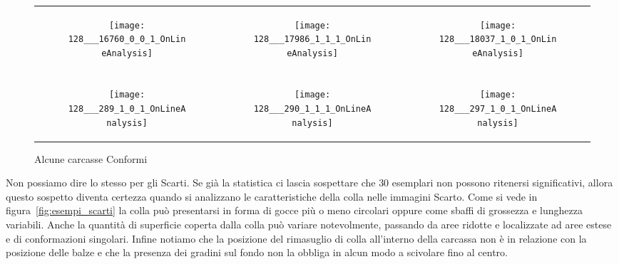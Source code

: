 \begin{figure}[ht] %
  \begin{center}
    \begin{tabular}{ccc}

  \begin{subfigure}{.3\linewidth}
    \centering\texttt{[image: 128\_\_\_16760\_0\_0\_1\_OnLineAnalysis]}
    \caption{}
  \end{subfigure} &

  \begin{subfigure}{.3\linewidth}
      \texttt{[image: 128\_\_\_17986\_1\_1\_1\_OnLineAnalysis]}
      \caption{}
    \end{subfigure} &

  \begin{subfigure}{.3\linewidth}
      \texttt{[image: 128\_\_\_18037\_1\_0\_1\_OnLineAnalysis]}
      \caption{}
    \end{subfigure} \\ \\

  \begin{subfigure}{.3\linewidth}
      \texttt{[image: 128\_\_\_289\_1\_0\_1\_OnLineAnalysis]}
      \caption{}
    \end{subfigure} &

  \begin{subfigure}{.3\linewidth}
      \texttt{[image: 128\_\_\_290\_1\_1\_1\_OnLineAnalysis]}
      \caption{}
    \end{subfigure} &

    \begin{subfigure}{.3\linewidth}
      \texttt{[image: 128\_\_\_297\_1\_0\_1\_OnLineAnalysis]}
      \caption{}
    \end{subfigure} \\

    \end{tabular}
    \caption{Alcune carcasse Conformi}
    \label{fig:esempi_conformi}
  \end{center}
\end{figure}


Non possiamo dire lo stesso per gli Scarti.
Se già la statistica ci lascia sospettare che $30$ esemplari non possono ritenersi significativi, allora questo sospetto diventa certezza quando si analizzano le caratteristiche della colla nelle immagini Scarto.  
Come si vede in figura~\ref{fig:esempi_scarti} la colla può presentarsi in forma di gocce più o meno circolari oppure come sbaffi di grossezza e lunghezza variabili.
Anche la quantità di superficie coperta dalla colla può variare notevolmente, passando da aree ridotte e localizzate ad aree estese e di conformazioni singolari.
Infine notiamo che la posizione del rimasuglio di colla all'interno della carcassa non è in relazione con la posizione delle balze e che la presenza dei gradini sul fondo non la obbliga in alcun modo a scivolare fino al centro.

